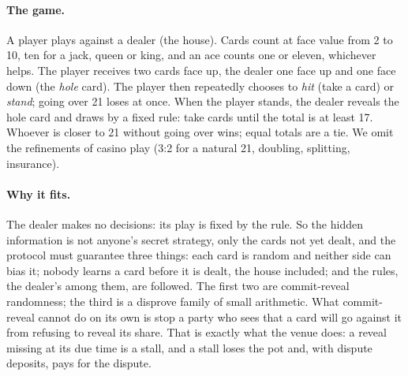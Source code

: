 \documentclass[11pt]{article}
\begin{document}
\paragraph{The game.} A player plays against a dealer (the house).
Cards count at face value from 2 to 10, ten for a jack, queen or king,
and an ace counts one or eleven, whichever helps. The player receives
two cards face up, the dealer one face up and one face down (the
\emph{hole} card). The player then repeatedly chooses to \emph{hit}
(take a card) or \emph{stand}; going over 21 loses at once. When the
player stands, the dealer reveals the hole card and draws by a fixed
rule: take cards until the total is at least 17. Whoever is closer to 21
without going over wins; equal totals are a tie. We omit the refinements
of casino play (3:2 for a natural 21, doubling, splitting, insurance).

\paragraph{Why it fits.} The dealer makes no decisions: its play is
fixed by the rule. So the hidden information is not anyone's secret
strategy, only the cards not yet dealt, and the protocol must guarantee
three things: each card is random and neither side can bias it; nobody
learns a card before it is dealt, the house included; and the rules,
the dealer's among them, are followed. The first two are commit-reveal
randomness; the third is a disprove family of small arithmetic. What
commit-reveal cannot do on its own is stop a party who sees that a card
will go against it from refusing to reveal its share. That is exactly
what the venue does: a reveal missing at its due time is a stall, and a
stall loses the pot and, with dispute deposits, pays for the dispute.
\end{document}
